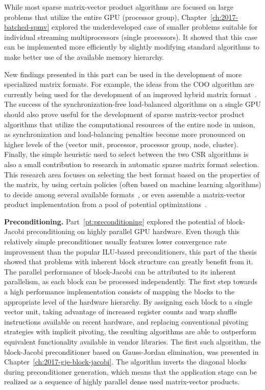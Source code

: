 While most sparse matrix-vector product algorithms are focused on large
problems that utilize the entire GPU (processor group),
Chapter~\ref{ch:2017-batched-spmv} explored the underdeveloped case of smaller
problems suitable for individual streaming multiprocessors (single processors).
It showed that this case can be implemented more efficiently by slightly
modifying standard algorithms to make better use of the available memory
hierarchy.

New findings presented in this part  can be used in the development of more
specialized matrix formats. For example, the ideas from the COO algorithm are
currently being used for the development of an improved hybrid matrix
format~\cite{hybrid}. The success of the synchronization-free load-balanced
algorithms on a single GPU should also prove useful for the development of
sparse matrix-vector product algorithms that utilize the computational resources
of the entire node in unison, as synchronization and load-balancing penalties
become more pronounced on higher levels of the 
(vector unit, processor, processor group, node, cluster). Finally, the
simple heuristic used to select between the two CSR algorithms is also a small
contribution to research in automatic sparse matrix format selection. This
research area focuses on selecting the best format based on the properties of
the matrix, by using certain policies (often based on machine learning
algorithms) to decide among several available
formats~\cite{clspmv,gpu-selection}, or even assemble a matrix-vector product
implementation from a pool of potential optimizations~\cite{elafrou}.

\noindent\textbf{Preconditioning.}
Part~\ref{pt:preconditioning} explored the potential of block-Jacobi
preconditioning on highly parallel GPU hardware. Even though this relatively
simple preconditioner usually features lower convergence rate improvement than
the popular ILU-based preconditioners, this part of the thesis showed that
problems with inherent block structure can greatly benefit from it.  The
parallel performance of block-Jacobi can be attributed to its inherent
parallelism, as each block can be processed independently. The first step
towards a high performance implementation consists of mapping the blocks to the
appropriate level of the hardware hierarchy. By assigning each block to a single
vector unit, taking advantage of increased register counts and warp shuffle
instructions available on recent hardware, and replacing conventional pivoting
strategies with implicit pivoting, the resulting algorithms are able to
outperform equivalent functionality available in vendor libraries. The first
such algorithm, the block-Jacobi preconditioner based on Gauss-Jordan
elimination, was presented in Chapter~\ref{ch:2017-gje-block-jacobi}. The
algorithm inverts the diagonal blocks during preconditioner generation, which
means that the application stage can be realized as a sequence of highly
parallel dense used matrix-vector products.


